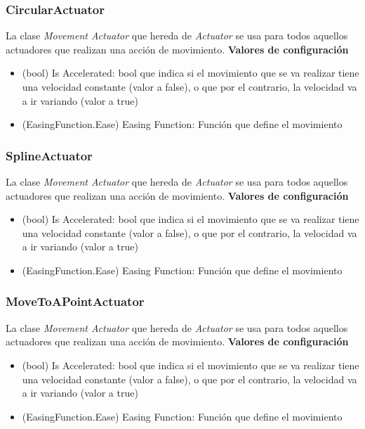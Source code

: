\subsubsection{CircularActuator}
La clase \textit{Movement Actuator} que hereda de \textit{Actuator} se usa para todos aquellos actuadores que realizan una acción de movimiento.
\textbf{Valores de configuración}
\begin{itemize}
	\item (bool) Is Accelerated: bool que indica si el movimiento que se va realizar tiene una velocidad constante (valor a false), o que por el contrario, la velocidad va a ir variando (valor a true)
	\item (EasingFunction.Ease) Easing Function: Función que define el movimiento 
\end{itemize}

\subsubsection{SplineActuator}
La clase \textit{Movement Actuator} que hereda de \textit{Actuator} se usa para todos aquellos actuadores que realizan una acción de movimiento.
\textbf{Valores de configuración}
\begin{itemize}
	\item (bool) Is Accelerated: bool que indica si el movimiento que se va realizar tiene una velocidad constante (valor a false), o que por el contrario, la velocidad va a ir variando (valor a true)
	\item (EasingFunction.Ease) Easing Function: Función que define el movimiento 
\end{itemize}

\subsubsection{MoveToAPointActuator}
La clase \textit{Movement Actuator} que hereda de \textit{Actuator} se usa para todos aquellos actuadores que realizan una acción de movimiento.
\textbf{Valores de configuración}
\begin{itemize}
	\item (bool) Is Accelerated: bool que indica si el movimiento que se va realizar tiene una velocidad constante (valor a false), o que por el contrario, la velocidad va a ir variando (valor a true)
	\item (EasingFunction.Ease) Easing Function: Función que define el movimiento 
\end{itemize}

